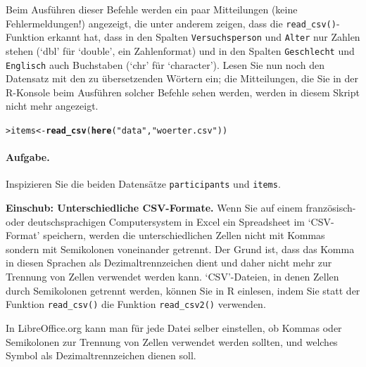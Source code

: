 \documentclass[oneside, 10pt]{book}\usepackage[]{graphicx}\usepackage[]{xcolor}
\makeatletter
\newcommand{\hlstr}[1]{\textcolor[rgb]{0.192,0.494,0.8}{#1}}%
\newcommand{\hlstd}[1]{\textcolor[rgb]{0.345,0.345,0.345}{#1}}%
\newcommand{\hlkwb}[1]{\textcolor[rgb]{0.69,0.353,0.396}{#1}}%
\newcommand{\hlkwd}[1]{\textcolor[rgb]{0.737,0.353,0.396}{\textbf{#1}}}%
\newenvironment{kframe}{%
 \def\at@end@of@kframe{}%
 \ifinner\ifhmode%
  \def\at@end@of@kframe{\end{minipage}}%
  \begin{minipage}{\columnwidth}%
 \fi\fi%
 \def\FrameCommand##1{\hskip\@totalleftmargin \hskip-\fboxsep
 \colorbox{shadecolor}{##1}\hskip-\fboxsep
     \hskip-\linewidth \hskip-\@totalleftmargin \hskip\columnwidth}%
 \MakeFramed {\advance\hsize-\width
   \@totalleftmargin\z@ \linewidth\hsize
   \@setminipage}}%
 {\par\unskip\endMakeFramed%
 \at@end@of@kframe}
\newenvironment{knitrout}{}{} %
\makeatother
\begin{document}
Beim Ausführen dieser Befehle werden ein paar Mitteilungen (keine Fehlermeldungen!)
angezeigt, die unter anderem zeigen, dass die \texttt{read\_csv()}-Funktion erkannt hat,
dass in den Spalten \texttt{Versuchsperson} und \texttt{Alter} nur Zahlen stehen (`dbl' für `double', ein Zahlenformat)
und in den Spalten \texttt{Geschlecht} und \texttt{Englisch} auch Buchstaben (`chr' für `character').
Lesen Sie nun noch den Datensatz mit den zu übersetzenden Wörtern ein; die Mitteilungen,
die Sie in der R-Konsole beim Ausführen solcher Befehle sehen werden,
werden in diesem Skript nicht mehr angezeigt.
\begin{knitrout}
\color{fgcolor}\begin{kframe}
\begin{alltt}
\hlstd{> }\hlstd{items} \hlkwb{<-} \hlkwd{read_csv}\hlstd{(}\hlkwd{here}\hlstd{(}\hlstr{"data"}\hlstd{,} \hlstr{"woerter.csv"}\hlstd{))}
\end{alltt}


{\ttfamily\noindent\itshape{}}\end{kframe}
\end{knitrout}

\paragraph{Aufgabe.} Inspizieren Sie die beiden Datensätze \texttt{participants}
und \texttt{items}.

\begin{framed}
\noindent \textbf{Einschub: Unterschiedliche CSV-Formate.} Wenn Sie auf einem französisch- oder
deutschsprachigen Computersystem in Excel ein Spread\-sheet im `CSV-Format' speichern,
werden die unterschiedlichen Zellen nicht mit Kommas sondern mit Semikolonen voneinander
getrennt. Der Grund ist, dass das Komma in diesen Sprachen als Dezimaltrennzeichen dient
und daher nicht mehr zur Trennung von Zellen verwendet werden kann. `CSV'-Dateien, in
denen Zellen durch Semikolonen getrennt werden, können Sie in R einlesen, indem Sie statt
der Funktion \texttt{read\_csv()} die Funktion \texttt{read\_csv2()} verwenden.

In LibreOffice.org kann man für jede Datei selber einstellen,
ob Kommas oder Semikolonen zur Trennung von Zellen verwendet werden sollten,
und welches Symbol als Dezimaltrennzeichen dienen soll.
\end{framed}
\end{document}
